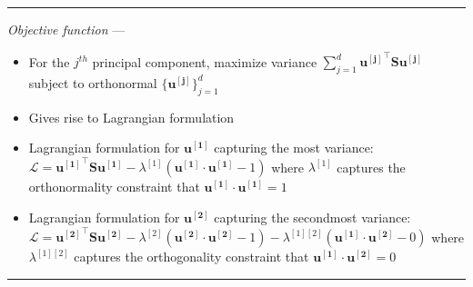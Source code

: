 {\color{lightgray}\hrule height 0.001mm}

\emph{Objective function} ---
\begin{itemize}
    \item For the $j^{th}$ principal component, maximize variance $\sum_{j=1}^d \boldsymbol{u^{[j]}}^\intercal \boldsymbol{S} \boldsymbol{u^{[j]}}$ subject to orthonormal $\{\boldsymbol{u^{[j]}}\}_{j=1}^d$
    \item Gives rise to Lagrangian formulation
    \item Lagrangian formulation for $\boldsymbol{u^{[1]}}$ capturing the most variance: $\mathcal{L} = \boldsymbol{u^{[1]}}^\intercal \boldsymbol{S} \boldsymbol{u^{[1]}} - \lambda^{[1]} (\boldsymbol{u^{[1]}} \cdot \boldsymbol{u^{[1]}} - 1)$ where $\lambda^{[1]}$ captures the orthonormality constraint that $\boldsymbol{u^{[1]}} \cdot \boldsymbol{u^{[1]}} = 1$
    \item Lagrangian formulation for $\boldsymbol{u^{[2]}}$ capturing the secondmost variance: $\mathcal{L} = \boldsymbol{u^{[2]}}^\intercal \boldsymbol{S} \boldsymbol{u^{[2]}} - \lambda^{[2]} (\boldsymbol{u^{[2]}} \cdot \boldsymbol{u^{[2]}} - 1) - \lambda^{[1][2]} (\boldsymbol{u^{[1]}} \cdot \boldsymbol{u^{[2]}} - 0)$ where $\lambda^{[1][2]}$ captures the orthogonality constraint that $\boldsymbol{u^{[1]}} \cdot \boldsymbol{u^{[2]}} = 0$
\end{itemize}

{\color{lightgray}\hrule height 0.001mm}

